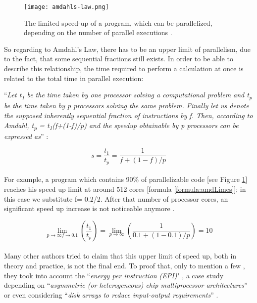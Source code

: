 \newpage

\begin{figure}[h!]
	\centering
	\texttt{[image: amdahls-law.png]}
	\caption{
		The limited speed-up of a program, which can be parallelized, depending on the number of parallel executions \parencite{image1} \parencite[similar to][p4]{phdthesis1}.
	}
	\label{fig:admLaw}
\end{figure}

\noindent So regarding to Amdahl's Law, there has to be an upper limit of parallelism, due to the fact, that some sequential fractions still exists. In order to be able to describe this relationship, the time required to perform a calculation at once is related to the total time in parallel execution:

``\textit{Let t\textsubscript{1} be the time taken by one processor solving a computational problem and t\textsubscript{p} be the time taken by p processors solving the same problem. Finally let us denote the supposed inherently sequential fraction of instructions by f. Then, according to Amdahl, t\textsubscript{p} = t\textsubscript{1}(f+(1-f)/p) and the speedup obtainable by p processors can be expressed as}'' \parencite[see][p81]{inbook1}:

\begin{equation} \label{formula:amd}
	s = \frac{t_1}{t_p} = \frac{1}{f + (1 - f) / p}
\end{equation}
\\[2pt]
For example, a program which contains 90\% of parallelizable code [see Figure \ref{fig:admLaw}] reaches his speed up limit at around 512 cores [formula  \ref{formula:amdLimes}]; in this case we substitute f= 0.2/2. After that number of processor cores, an significant speed up increase is not noticeable anymore . 

\begin{equation} \label{formula:amdLimes}
	\lim_{p \to \infty f \to 0.1} \left( \frac{t_1}{t_p} \right) = \lim_{p \to \infty} \left( \frac{1}{0.1 + (1 - 0.1) / p} \right) = 10
\end{equation}
\\[2pt]
Many other authors tried to claim that this upper limit of speed up, both in theory and practice, is not the final end. To proof that, only to mention a few , they took into account the ``\textit{energy per instruction (EPI)}" \parencite[Annavaram et al. in][Chapter 3,  p81]{inbook1}, a case study depending on ``\textit{asymmetric (or heterogeneous) chip multiprocessor architectures}'' \parencite[Kumar et al. in][Chapter 3,  p81]{inbook1} or even considering ``\textit{disk arrays to reduce input-output requirements}'' \parencite[Patterson et al. in][Chapter 3,  p81]{inbook1}.

